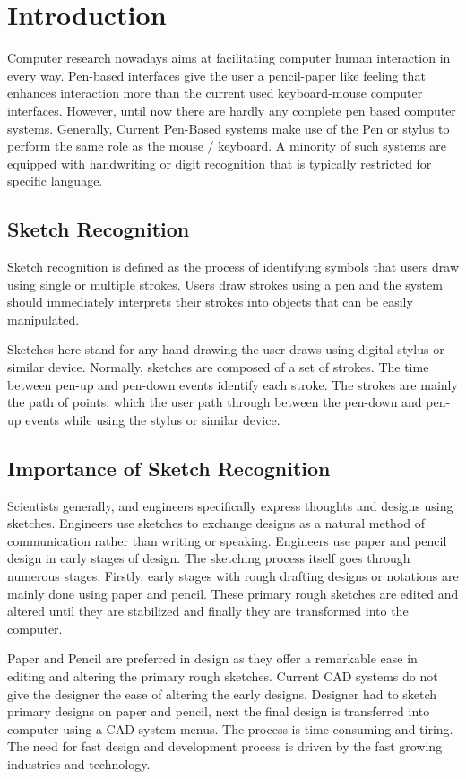 \chapter {Introduction}
Computer research nowadays aims at facilitating computer human interaction in every way. Pen-based interfaces give the user a pencil-paper like feeling that enhances interaction more than the current used keyboard-mouse computer interfaces. However, until now there are hardly any complete pen based computer systems. Generally, Current Pen-Based systems make use of the Pen or stylus to perform the same role as the mouse / keyboard. A minority of such systems are equipped with handwriting or digit recognition that is typically restricted for specific language. 

\section{Sketch Recognition}
Sketch recognition is defined as the process of identifying symbols that users draw using single or multiple strokes. Users draw strokes using a pen and the system should immediately interprets their strokes into objects that can be easily manipulated.

Sketches here stand for any hand drawing the user draws using digital stylus or similar device. Normally, sketches are composed of a set of strokes. The time between pen-up and pen-down events identify each stroke. The strokes are mainly the path of points, which the user path through between the pen-down and pen-up events while using the stylus or similar device. 
  
\section{Importance of Sketch Recognition}
\label{sec:ImportanceOfSketchRecognition}
Scientists generally, and engineers specifically express thoughts and designs using sketches. Engineers use sketches to exchange designs as a natural method of communication rather than writing or speaking. Engineers use paper and pencil design in early stages of design. The sketching process itself goes through numerous stages. Firstly, early stages with rough drafting designs or notations are mainly done using paper and pencil. These primary rough sketches are edited and altered until they are stabilized and finally they are transformed into the computer. 

 Paper and Pencil are preferred in design as they offer a remarkable ease in editing and altering the primary rough sketches. Current CAD systems do not give the designer the ease of altering the early designs. Designer had to sketch primary designs on paper and pencil, next the final design is transferred into computer using a CAD system menus. The process is time consuming and tiring. The need for fast design and development process is driven by the fast growing industries and technology.
 
